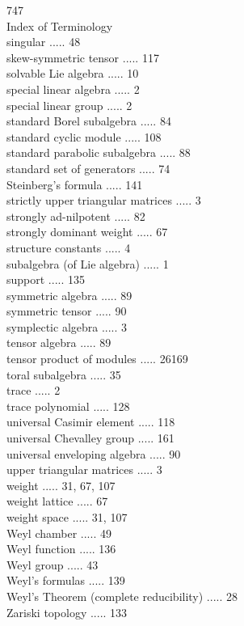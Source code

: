\documentclass[10pt]{article}
\begin{document}
747\\
Index of Terminology\\
singular ..... 48\\
skew-symmetric tensor ..... 117\\
solvable Lie algebra ..... 10\\
special linear algebra ..... 2\\
special linear group ..... 2\\
standard Borel subalgebra ..... 84\\
standard cyclic module ..... 108\\
standard parabolic subalgebra ..... 88\\
standard set of generators ..... 74\\
Steinberg's formula ..... 141\\
strictly upper triangular matrices ..... 3\\
strongly ad-nilpotent ..... 82\\
strongly dominant weight ..... 67\\
structure constants ..... 4\\
subalgebra (of Lie algebra) ..... 1\\
support ..... 135\\
symmetric algebra ..... 89\\
symmetric tensor ..... 90\\
symplectic algebra ..... 3\\
tensor algebra ..... 89\\
tensor product of modules ..... 26169\\
toral subalgebra ..... 35\\
trace ..... 2\\
trace polynomial ..... 128\\
universal Casimir element ..... 118\\
universal Chevalley group ..... 161\\
universal enveloping algebra ..... 90\\
upper triangular matrices ..... 3\\
weight ..... 31, 67, 107\\
weight lattice ..... 67\\
weight space ..... 31, 107\\
Weyl chamber ..... 49\\
Weyl function ..... 136\\
Weyl group ..... 43\\
Weyl's formulas ..... 139\\
Weyl's Theorem (complete reducibility) ..... 28\\
Zariski topology ..... 133
\end{document}
